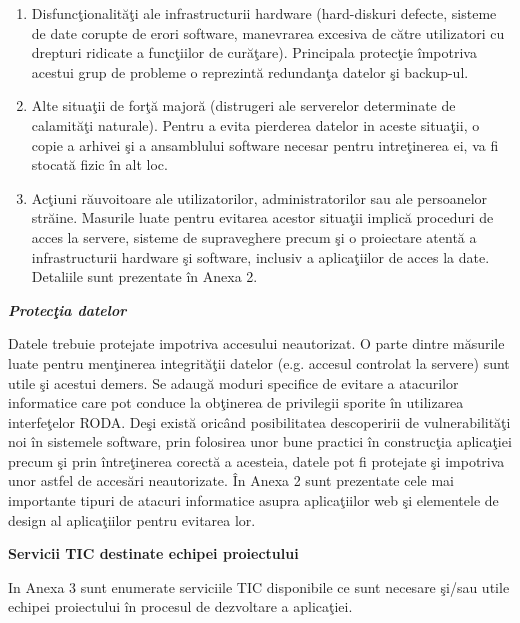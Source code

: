 \documentclass[a4paper]{article}
\newcommand\liststyleLSi{%
\renewcommand\theenumi{\arabic{enumi}}
\renewcommand\theenumii{\arabic{enumii}}
\renewcommand\theenumiii{\arabic{enumiii}}
\renewcommand\theenumiv{\arabic{enumiv}}
\renewcommand\labelenumi{\theenumi.}
\renewcommand\labelenumii{\theenumii.}
\renewcommand\labelenumiii{\theenumiii.}
\renewcommand\labelenumiv{\theenumiv.}
}
\begin{document}
{\liststyleLSi
\begin{enumerate}
\item {
Disfunc\c{t}ionalit\u{a}\c{t}i ale infrastructurii hardware (hard-diskuri defecte, sisteme de date corupte de erori
software, manevrarea excesiva de c\u{a}tre utilizatori cu drepturi ridicate a func\c{t}iilor de cur\u{a}\c{t}are).
Principala protec\c{t}ie \^impotriva acestui grup de probleme o reprezint\u{a} redundan\c{t}a datelor \c{s}i
backup-ul.}
\item {
Alte situa\c{t}ii de for\c{t}\u{a} major\u{a} (distrugeri ale serverelor determinate de calamit\u{a}\c{t}i naturale).
Pentru a evita pierderea datelor in aceste situa\c{t}ii, o copie a arhivei \c{s}i a ansamblului software necesar
pentru intre\c{t}inerea ei, va fi stocat\u{a} fizic \^in alt loc.}
\item {
Ac\c{t}iuni r\u{a}uvoitoare ale utilizatorilor, administratorilor sau ale persoanelor str\u{a}ine. Masurile luate
pentru evitarea acestor situa\c{t}ii implic\u{a} proceduri de acces la servere, sisteme de supraveghere precum \c{s}i
o proiectare atent\u{a} a infrastructurii hardware \c{s}i software, inclusiv a aplica\c{t}iilor de acces la date.
Detaliile sunt prezentate \^in Anexa 2.}
\end{enumerate}
{\bfseries\itshape\color[rgb]{0.0,0.0,0.039215688}
Protec\c{t}ia datelor}

{
Datele trebuie protejate impotriva accesului neautorizat. O parte dintre m\u{a}surile luate pentru men\c{t}inerea
integrit\u{a}\c{t}ii datelor (e.g. accesul controlat la servere) sunt utile \c{s}i acestui demers. Se adaug\u{a}
moduri specifice de evitare a atacurilor informatice care pot conduce la ob\c{t}inerea de privilegii sporite \^in
utilizarea interfe\c{t}elor RODA. De\c{s}i exist\u{a} oric\^and posibilitatea descoperirii de
vulnerabilit\u{a}\c{t}i noi \^in sistemele software, prin folosirea unor bune practici \^in construc\c{t}ia
aplica\c{t}iei precum \c{s}i prin \^intre\c{t}inerea corect\u{a} a acesteia, datele pot fi protejate \c{s}i
impotriva unor astfel de acces\u{a}ri neautorizate. \^In Anexa 2 sunt prezentate cele mai importante tipuri de atacuri
informatice asupra aplica\c{t}iilor web \c{s}i elementele de design al aplica\c{t}iilor pentru evitarea lor.}

{\bfseries\color[rgb]{0.0,0.0,0.039215688}
Servicii TIC destinate echipei proiectului}

{
In Anexa 3 sunt enumerate serviciile TIC disponibile ce sunt necesare \c{s}i/sau utile echipei proiectului \^in
procesul de dezvoltare a aplica\c{t}iei.}


}
\end{document}
